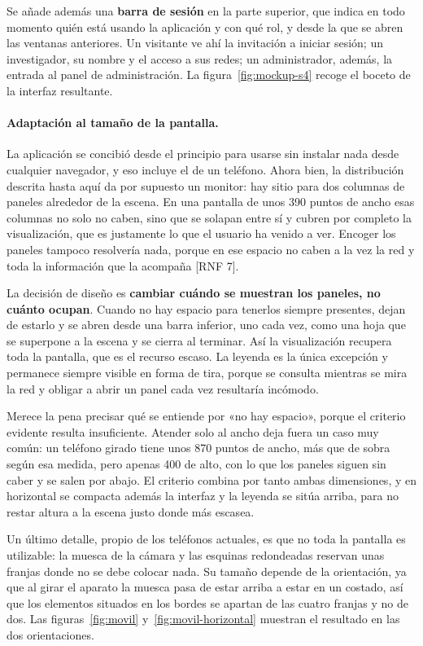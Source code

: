 Se añade además una \textbf{barra de sesión} en la parte superior, que indica en todo momento quién
está usando la aplicación y con qué rol, y desde la que se abren las ventanas anteriores. Un
visitante ve ahí la invitación a iniciar sesión; un investigador, su nombre y el acceso a sus redes;
un administrador, además, la entrada al panel de administración. La figura~\ref{fig:mockup-s4}
recoge el boceto de la interfaz resultante.

\paragraph*{Adaptación al tamaño de la pantalla.} La aplicación se concibió desde el principio para
usarse sin instalar nada desde cualquier navegador, y eso incluye el de un teléfono. Ahora bien, la
distribución descrita hasta aquí da por supuesto un monitor: hay sitio para dos columnas de paneles
alrededor de la escena. En una pantalla de unos 390 puntos de ancho esas columnas no solo no caben,
sino que se solapan entre sí y cubren por completo la visualización, que es justamente lo que el
usuario ha venido a ver. Encoger los paneles tampoco resolvería nada, porque en ese espacio no caben
a la vez la red y toda la información que la acompaña [RNF 7].

La decisión de diseño es \textbf{cambiar cuándo se muestran los paneles, no cuánto ocupan}. Cuando
no hay espacio para tenerlos siempre presentes, dejan de estarlo y se abren desde una barra inferior,
uno cada vez, como una hoja que se superpone a la escena y se cierra al terminar. Así la
visualización recupera toda la pantalla, que es el recurso escaso. La leyenda es la única excepción y
permanece siempre visible en forma de tira, porque se consulta mientras se mira la red y obligar a
abrir un panel cada vez resultaría incómodo.

Merece la pena precisar qué se entiende por «no hay espacio», porque el criterio evidente
resulta insuficiente. Atender solo al ancho deja fuera un caso muy común: un teléfono girado tiene
unos 870 puntos de ancho, más que de sobra según esa medida, pero apenas 400 de alto, con lo que los
paneles siguen sin caber y se salen por abajo. El criterio combina por tanto ambas dimensiones, y en
horizontal se compacta además la interfaz y la leyenda se sitúa arriba, para no restar altura a la
escena justo donde más escasea.

Un último detalle, propio de los teléfonos actuales, es que no toda la pantalla es utilizable: la
muesca de la cámara y las esquinas redondeadas reservan unas franjas donde no se debe colocar nada.
Su tamaño depende de la orientación, ya que al girar el aparato la muesca pasa de estar arriba a
estar en un costado, así que los elementos situados en los bordes se apartan de las cuatro franjas y
no de dos. Las figuras~\ref{fig:movil}
y~\ref{fig:movil-horizontal} muestran el resultado en las dos orientaciones.

